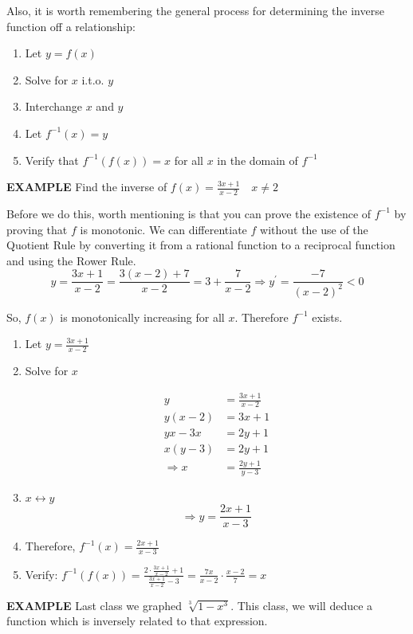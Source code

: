\documentclass{article}
\begin{document}
Also, it is worth remembering the general process for determining the inverse function off a relationship:

\begin{enumerate}
\item Let $y=f(x)$
\item Solve for $x$ i.t.o. $y$
\item Interchange $x$ and $y$
\item Let $f^{-1}(x)=y$
\item Verify that $f^{-1}(f(x))=x$ for all $x$ in the domain of $f^{-1}$
\end{enumerate}

{\bf{}EXAMPLE} Find the inverse of $f(x)=\frac{3x+1}{x-2}\quad x\neq2$

\vspace{10pt}

Before we do this, worth mentioning is that you can prove the existence of $f^{-1}$ by proving that $f$ is monotonic. We can differentiate $f$ without the use of the Quotient Rule by converting it from a rational function to a reciprocal function and using the Rower Rule. \[y=\frac{3x+1}{x-2}=\frac{3(x-2)+7}{x-2}=3+\frac{7}{x-2}\Rightarrow y^\prime=\frac{-7}{(x-2)^2}<0\]

So, $f(x)$ is monotonically increasing for all $x$. Therefore $f^{-1}$ exists.

\begin{enumerate}
\item Let $y=\frac{3x+1}{x-2}$
\item Solve for $x$

\begin{align*}
y&=\frac{3x+1}{x-2}\\
y(x-2)&=3x+1\\
yx-3x&=2y+1\\
x(y-3)&=2y+1\\
\Rightarrow x&=\frac{2y+1}{y-3}
\end{align*}

\item $x\leftrightarrow y$ \[\Rightarrow y=\frac{2x+1}{x-3}\]
\item Therefore, $f^{-1}(x)=\frac{2x+1}{x-3}$
\item Verify: $f^{-1}(f(x))=\frac{2\cdot\frac{3x+1}{x-2}+1}{\frac{3x+1}{x-2}-3}=\frac{7x}{x-2}\cdot\frac{x-2}{7}=x$
\end{enumerate}

{\bf{}EXAMPLE} Last class we graphed $\sqrt[3]{1-x^3}$. This class, we will deduce a function which is inversely related to that expression.
\end{document}
